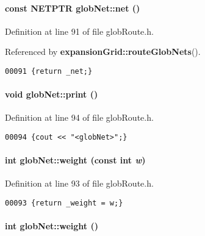 \paragraph{\setlength{\rightskip}{0pt plus 5cm}const NETPTR glob\-Net::net ()\hspace{0.3cm}{\tt  [inline]}}\hfill



Definition at line 91 of file glob\-Route.h.

Referenced by {\bf expansion\-Grid::route\-Glob\-Nets}().\small\begin{verbatim}00091 {return _net;}
\end{verbatim}\normalsize 
\label{globNet_a4}
\paragraph{\setlength{\rightskip}{0pt plus 5cm}void glob\-Net::print ()\hspace{0.3cm}{\tt  [inline, virtual]}}\hfill



Definition at line 94 of file glob\-Route.h.\small\begin{verbatim}00094 {cout << "<globNet>";}
\end{verbatim}\normalsize 
\label{globNet_a3}
\paragraph{\setlength{\rightskip}{0pt plus 5cm}int glob\-Net::weight (const int {\em w})\hspace{0.3cm}{\tt  [inline]}}\hfill



Definition at line 93 of file glob\-Route.h.\small\begin{verbatim}00093 {return _weight = w;}
\end{verbatim}\normalsize 
\label{globNet_a2}
\paragraph{\setlength{\rightskip}{0pt plus 5cm}int glob\-Net::weight ()\hspace{0.3cm}{\tt  [inline]}}\hfill




